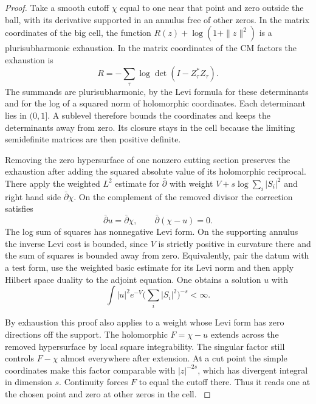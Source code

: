 \begin{proof}
Take a smooth cutoff \(\chi\) equal to one near that point
and zero outside the ball, with its derivative supported
in an annulus free of other zeros. In the matrix coordinates
of the big cell, the function \(R(z)+\log(1+\|z\|^2)\)
is a plurisubharmonic exhaustion. In the matrix coordinates of the CM factors the exhaustion is
\[
  R=-\sum_\tau\log\det(I-Z_\tau^*Z_\tau).
\]
The summands are plurisubharmonic, by the Levi formula for
these determinants and for the log of a squared norm of
holomorphic coordinates. Each determinant lies in \((0,1]\).
A sublevel therefore bounds the coordinates and keeps the
determinants away from zero. Its closure stays in the cell
because the limiting semidefinite matrices are then positive
definite.

Removing the zero hypersurface of one nonzero
cutting section preserves the exhaustion after adding the
squared absolute value of its holomorphic reciprocal.
\label{cor:slice-interpolation-2}
There apply the
weighted \(L^2\) estimate for \(\bar\partial\) with weight
\(V+s\log\sum_i|S_i|^2\) and right hand side
\(\bar\partial\chi\).
On the complement of the removed divisor the correction satisfies
\[
  \bar\partial u=\bar\partial\chi,\qquad \bar\partial(\chi-u)=0 .
\]
 The log sum of squares has nonnegative
Levi form. On the supporting annulus the inverse Levi cost
is bounded, since \(V\) is strictly positive in curvature
there and the sum of squares is bounded away from zero.
Equivalently, pair the datum with a test form, use the
weighted basic estimate for its Levi norm and then apply
Hilbert space duality to the adjoint equation. One obtains
a solution \(u\) with
\[
           \int |u|^2 e^{-V}
                 \big(\sum_i |S_i|^2\big)^{-s}<\infty .
\]

By exhaustion this proof also applies to a weight whose
Levi form has zero directions off the support. The
holomorphic \(F=\chi-u\) extends across the removed
hypersurface by local square integrability. The singular
factor still controls \(F-\chi\) almost everywhere after
extension. At a cut point the simple coordinates make
this factor comparable with \(|z|^{-2s}\), which has
divergent integral in dimension \(s\). Continuity forces
\(F\) to equal the cutoff there. Thus it reads one at the
chosen point and zero at other zeros in the cell.
\cite{hormander-slice}\label{cor:slice-interpolation-3}


\end{proof}
